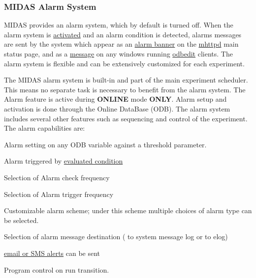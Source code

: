 \par


\label{RC_customize_ODB_idx_alarm_system}
\hypertarget{RC_customize_ODB_idx_alarm_system}{}
 

 \hypertarget{RC_customize_ODB_RC_Alarm_System}{}\subsubsection{MIDAS Alarm System}\label{RC_customize_ODB_RC_Alarm_System}
MIDAS provides an alarm system, which by default is turned off. When the alarm system is \hyperlink{RC_customize_ODB_RC_alarm_system_active}{activated} and an alarm condition is detected, alarms messages are sent by the system which appear as an \hyperlink{RC_mhttpd_Alarm_page_RC_mhttpd_alarm_banner}{alarm banner} on the \hyperlink{RC_mhttpd_utility}{mhttpd} main status page, and as a \hyperlink{RC_mhttpd_Alarm_page_RC_odb_alarm_msg}{message} on any windows running \hyperlink{RC_odbedit_utility}{odbedit} clients. The alarm system is flexible and can be extensively customized for each experiment.

The MIDAS alarm system is built-\/in and part of the main experiment scheduler. This means no separate task is necessary to benefit from the alarm system. The Alarm feature is active during {\bfseries ONLINE} mode {\bfseries ONLY}.  Alarm setup and activation is done through the Online DataBase (ODB). The alarm system includes several other features such as sequencing and control of the experiment. The alarm capabilities are:
\begin{DoxyItemize}
\item Alarm setting on any ODB variable against a threshold parameter.
\item Alarm triggered by \hyperlink{RC_customize_ODB_RC_evaluated_alarm_condition}{evaluated condition}
\item Selection of Alarm check frequency
\item Selection of Alarm trigger frequency
\item Customizable alarm scheme; under this scheme multiple choices of alarm type can be selected.
\item Selection of alarm message destination ( to system message log or to elog)
\item \hyperlink{RC_customize_ODB_RC_alarms_email}{email or SMS alerts} can be sent
\item Program control on run transition.
\end{DoxyItemize}

